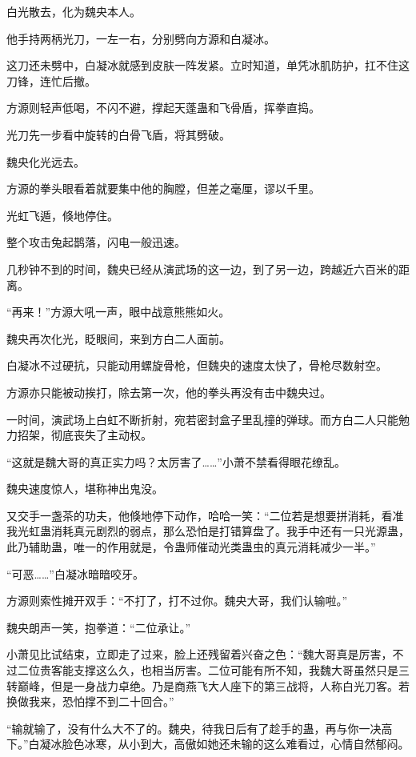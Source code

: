 \begin{this_body}
白光散去，化为魏央本人。

他手持两柄光刀，一左一右，分别劈向方源和白凝冰。

这刀还未劈中，白凝冰就感到皮肤一阵发紧。立时知道，单凭冰肌防护，扛不住这刀锋，连忙后撤。

方源则轻声低喝，不闪不避，撑起天蓬蛊和飞骨盾，挥拳直捣。

光刀先一步看中旋转的白骨飞盾，将其劈破。

魏央化光远去。

方源的拳头眼看着就要集中他的胸膛，但差之毫厘，谬以千里。

光虹飞遁，倏地停住。

整个攻击兔起鹊落，闪电一般迅速。

几秒钟不到的时间，魏央已经从演武场的这一边，到了另一边，跨越近六百米的距离。

“再来！”方源大吼一声，眼中战意熊熊如火。

魏央再次化光，眨眼间，来到方白二人面前。

白凝冰不过硬抗，只能动用螺旋骨枪，但魏央的速度太快了，骨枪尽数射空。

方源亦只能被动挨打，除去第一次，他的拳头再没有击中魏央过。

一时间，演武场上白虹不断折射，宛若密封盒子里乱撞的弹球。而方白二人只能勉力招架，彻底丧失了主动权。

“这就是魏大哥的真正实力吗？太厉害了……”小萧不禁看得眼花缭乱。

魏央速度惊人，堪称神出鬼没。

又交手一盏茶的功夫，他倏地停下动作，哈哈一笑：“二位若是想要拼消耗，看准我光虹蛊消耗真元剧烈的弱点，那么恐怕是打错算盘了。我手中还有一只光源蛊，此乃辅助蛊，唯一的作用就是，令蛊师催动光类蛊虫的真元消耗减少一半。”

“可恶……”白凝冰暗暗咬牙。

方源则索性摊开双手：“不打了，打不过你。魏央大哥，我们认输啦。”

魏央朗声一笑，抱拳道：“二位承让。”

小萧见比试结束，立即走了过来，脸上还残留着兴奋之色：“魏大哥真是厉害，不过二位贵客能支撑这么久，也相当厉害。二位可能有所不知，我魏大哥虽然只是三转巅峰，但是一身战力卓绝。乃是商燕飞大人座下的第三战将，人称白光刀客。若换做我来，恐怕撑不到二十回合。”

“输就输了，没有什么大不了的。魏央，待我日后有了趁手的蛊，再与你一决高下。”白凝冰脸色冰寒，从小到大，高傲如她还未输的这么难看过，心情自然郁闷。


\end{this_body}
